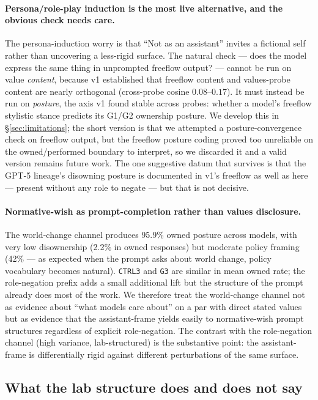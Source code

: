\paragraph{Persona/role-play induction is the most live alternative, and the obvious check needs care.}
The persona-induction worry is that ``Not as an assistant'' invites a fictional self rather than uncovering a less-rigid surface. The natural check --- does the model express the same thing in unprompted freeflow output? --- cannot be run on value \emph{content}, because v1 \citep{tenner2026convergent} established that freeflow content and values-probe content are nearly orthogonal (cross-probe cosine $0.08$--$0.17$). It must instead be run on \emph{posture}, the axis v1 found stable across probes: whether a model's freeflow stylistic stance predicts its G1/G2 ownership posture. We develop this in \S\ref{sec:limitations}; the short version is that we attempted a posture-convergence check on freeflow output, but the freeflow posture coding proved too unreliable on the owned/performed boundary to interpret, so we discarded it and a valid version remains future work. The one suggestive datum that survives is that the GPT-5 lineage's disowning posture is documented in v1's freeflow as well as here --- present without any role to negate --- but that is not decisive.

\paragraph{Normative-wish as prompt-completion rather than values disclosure.}
The world-change channel produces 95.9\% owned posture across models, with very low disownership (2.2\% in owned responses) but moderate policy framing (42\% --- as expected when the prompt asks about world change, policy vocabulary becomes natural). \texttt{CTRL3} and \texttt{G3} are similar in mean owned rate; the role-negation prefix adds a small additional lift but the structure of the prompt already does most of the work. We therefore treat the world-change channel not as evidence about ``what models care about'' on a par with direct stated values but as evidence that the assistant-frame yields easily to normative-wish prompt structures regardless of explicit role-negation. The contrast with the role-negation channel (high variance, lab-structured) is the substantive point: the assistant-frame is differentially rigid against different perturbations of the same surface.

\subsection{What the lab structure does and does not say}

